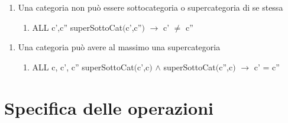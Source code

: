 \documentclass{article}
\begin{document}
\begin{enumerate}
    \item Una categoria non può essere sottocategoria o supercategoria di se stessa
    \begin{enumerate}
        \item ALL c',c'' superSottoCat$($c',c''$)$ $\rightarrow$ c' $\neq$ c''
    \end{enumerate}
\end{enumerate}

\begin{enumerate}
    \item Una categoria può avere al massimo una supercategoria
    \begin{enumerate}
        \item ALL c, c', c'' superSottoCat$($c',c$)$ $\land$ superSottoCat$($c'',c$)$ $\rightarrow$ c' = c''
    \end{enumerate}
\end{enumerate}

\newpage
\section{\label{sec:SpecificaOperazioni}Specifica delle operazioni}
\end{document}
